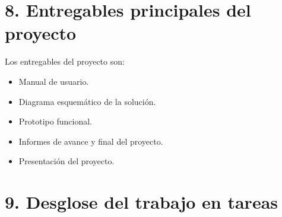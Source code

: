 \documentclass[
11pt, %
codirector, %
]{charter}
\begin{document}
\section{8. Entregables principales del proyecto}
\label{sec:entregables}

Los entregables del proyecto son:

\begin{itemize}
	\item Manual de usuario.
	\item Diagrama esquemático de la solución.
	\item Prototipo funcional.
	\item Informes de avance y final del proyecto.
	\item Presentación del proyecto.
\end{itemize}

\section{9. Desglose del trabajo en tareas}
\label{sec:wbs}
\end{document}
